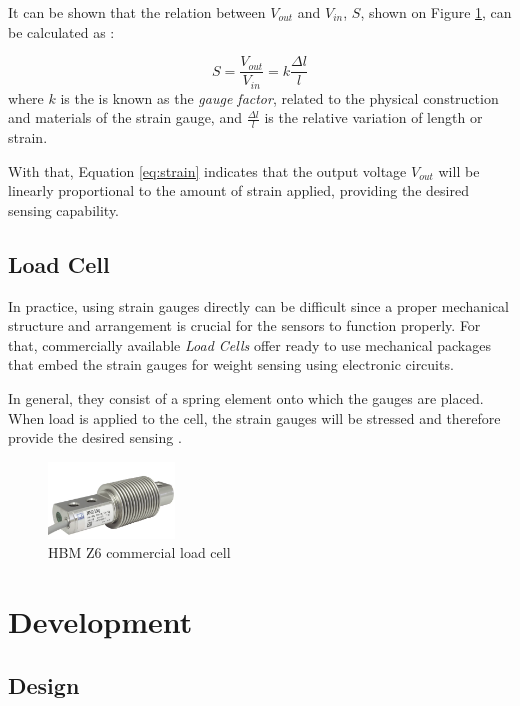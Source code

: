 \documentclass[openright]{normas-utf-tex} %
\begin{document}
It can be shown that the relation between $V_{out}$ and $V_{in}$, $S$, shown on Figure \ref{fig:gauge2}, can be
calculated as \cite{Stefanescu}:

\begin{equation}
    \label{eq:strain}
    S = \frac{V_{out}}{V_{in}} = k\frac{\Delta l}{l}
\end{equation}
where $k$ is the is known as the \textit{gauge factor}, related to the physical construction and materials of the strain gauge, and 
$\frac{\Delta l}{l}$ is the relative variation of length or strain.

With that, Equation \ref{eq:strain} indicates that the output voltage $V_{out}$ will be linearly proportional to the
amount of strain applied, providing the desired sensing capability.

\section{Load Cell}

In practice, using strain gauges directly can be difficult since a proper
mechanical structure and arrangement is crucial for the sensors to function
properly. For that, commercially available \textit{Load Cells} offer ready to
use mechanical packages that embed the strain gauges for weight sensing
using electronic circuits.

In general, they consist of a spring element onto which the gauges are placed.
When load is applied to the cell, the strain gauges will be stressed and
therefore provide the desired sensing \cite{HBM2022}.

\begin{figure}[H]
	\centering
	\includegraphics[width=0.3\textwidth]{./images/hbmz6.png}
	\caption[HBM Z6 commercial load cell]{HBM Z6 commercial load cell}
	\label{fig:gauge2}
\end{figure}

\chapter{Development}
\label{chap:desenv}

\section{Design}
\label{sec:design}
\end{document}
